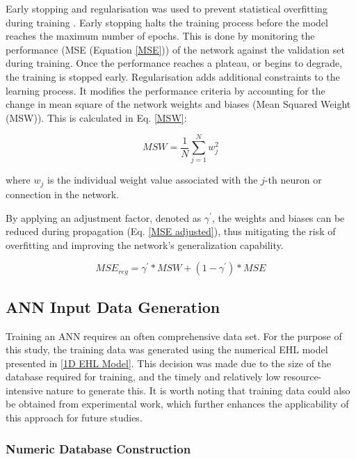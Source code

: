 Early stopping and regularisation was used to prevent statistical overfitting during training \cite{MatlabOverfit}. Early stopping halts the training process before the model reaches the maximum number of epochs. This is done by monitoring the performance (MSE (Equation \ref{MSE})) of the network against the validation set during training. Once the performance reaches a plateau, or begins to degrade, the training is stopped early. Regularisation adds additional constraints to the learning process. It modifies the performance criteria by accounting for the change in mean square of the network weights and biases (Mean Squared Weight (MSW)). This is calculated in Eq. \ref{MSW}: 

\begin{equation}\label{MSW}
	M S W=\frac{1}{N} \sum_{j=1}^N w_j^2
\end{equation}

where $w_j$ is the individual weight value associated with the $j$-th neuron or connection in the network.

By applying an adjustment factor, denoted as $\gamma^{\prime}$, the weights and biases can be reduced during propagation (Eq. \ref{MSE adjusted}), thus mitigating the risk of overfitting and improving the network's generalization capability.

\begin{equation}\label{MSE adjusted}
	M S E_{r e g}=\gamma^{\prime} * M S W+\left(1-\gamma^{\prime}\right) * M S E
\end{equation}


\subsection{ANN Input Data Generation}

Training an ANN requires an often comprehensive data set. For the purpose of this study, the training data was generated using the numerical EHL model presented in \ref{1D EHL Model}. This decision was made due to the size of the database required for training, and the timely and relatively low resource-intensive nature to generate this. It is worth noting that training data could also be obtained from experimental work, which further enhances the applicability of this approach for future studies.

\subsubsection{Numeric Database Construction}

